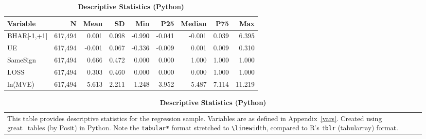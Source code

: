 \documentclass[english,authoryear,IEEEtran,12pt]{article}
\begin{document}
\begin{table}[htbp]\centering\footnotesize{
\renewcommand{\arraystretch}{1.5}
\caption{\textbf{Descriptive Statistics (Python)} \label{tab:descrip-py}}

\begin{tabular*}{\linewidth}{@{\extracolsep{\fill}}lrrrrrrrr}
\toprule
Variable & N & Mean & SD & Min & P25 & Median & P75 & Max \\
\midrule\addlinespace[2.5pt]
BHAR[-1,+1] & 617,494 & 0.001 & 0.098 & -0.990 & -0.041 & -0.001 & 0.039 & 6.395 \\
UE & 617,494 & -0.001 & 0.067 & -0.336 & -0.009 & 0.001 & 0.009 & 0.310 \\
SameSign & 617,494 & 0.666 & 0.472 & 0.000 & 0.000 & 1.000 & 1.000 & 1.000 \\
LOSS & 617,494 & 0.303 & 0.460 & 0.000 & 0.000 & 0.000 & 1.000 & 1.000 \\
ln(MVE) & 617,494 & 5.613 & 2.211 & 1.248 & 3.952 & 5.487 & 7.114 & 11.219 \\
\bottomrule
\end{tabular*}

\vspace{-1.5\baselineskip}
\singlespace
\flushleft
\begin{tabular}{@{}p{\linewidth}@{}}
\footnotesize
This table provides descriptive statistics for the regression sample. Variables are as defined in Appendix~\ref{vars}. Created using great\_tables (by Posit) in Python. Note the \texttt{tabular*} format stretched to \texttt{\textbackslash linewidth}, compared to R's \texttt{tblr} (tabularray) format.
\end{tabular}
}
\end{table}


\clearpage\newpage

\end{document}
